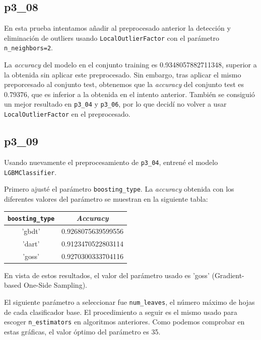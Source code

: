 \documentclass[a4]{article}
\begin{document}
\subsection{p3\_08}

En esta prueba intentamos añadir al preprocesado anterior la detección y eliminación de outliers usando \texttt{LocalOutlierFactor} con el parámetro \texttt{n\_neighbors=2}.

La \textit{accuracy} del modelo en el conjunto training es 0.9348057882711348, superior a la obtenida sin aplicar este preprocesado. Sin embargo, tras aplicar el mismo preporcesado al conjunto test, obtenemos que la \textit{accuracy} del conjunto test es 0.79376, que es inferior a la obtenida en el intento anterior. También se consiguió un mejor resultado en \texttt{p3\_04} y \texttt{p3\_06}, por lo que decidí no volver a usar \texttt{LocalOutlierFactor} en el preprocesado.

\subsection{p3\_09}

Usando nuevamente el preprocesamiento de \texttt{p3\_04}, entrené el modelo \texttt{LGBMClassifier}.

Primero ajusté el parámetro \texttt{boosting\_type}. La \textit{accuracy} obtenida con los diferentes valores del parámetro se muestran en la siguiente tabla:

\begin{center}
\begin{tabular}{|c|c|}
\hline
  \multicolumn{1}{|c|}{\texttt{boosting\_type}} & \textit{Accuracy}  \\ \hline
  
  'gbdt' & 0.9268075639599556 \\
  'dart' & 0.9123470522803114 \\
  'goss' & 0.9270300333704116 \\ \hline
\end{tabular}
\end{center}

En vista de estos resultados, el valor del parámetro usado es 'goss' (Gradient-based One-Side Sampling).

El siguiente parámetro a seleccionar fue \texttt{num\_leaves}, el número máximo de hojas de cada clasificador base. El procedimiento a seguir es el mismo usado para escoger \texttt{n\_estimators} en algoritmos anteriores. Como podemos comprobar en estas gráficas, el valor óptimo del parámetro es 35.
\end{document}
